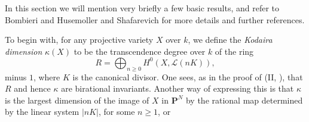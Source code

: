 {In this section we will mention very briefly a few basic results, and refer to Bombieri and Husemoller  and Shafarevich  for more details and further references.

\medskip
To begin with, for any \EditionText{}projective variety $X$ over $k$, we define the \emph{Kodaira dimension} $\kappa(X)$ to be the transcendence degree over $k$ of the ring
\[
R=\bigoplus_{n\ge0}H^0(X,\mathcal L(nK)),
\]
minus $1$, where $K$ is the canonical divisor. One sees, as in the proof of (II, ), that $R$ and hence $\kappa$ are birational invariants. Another way of expressing this is that $\kappa$ is the largest dimension of the image of $X$ in $\mathbf P^N$ by the rational map determined by the linear system $|nK|$, for some $n\ge1$, or}
